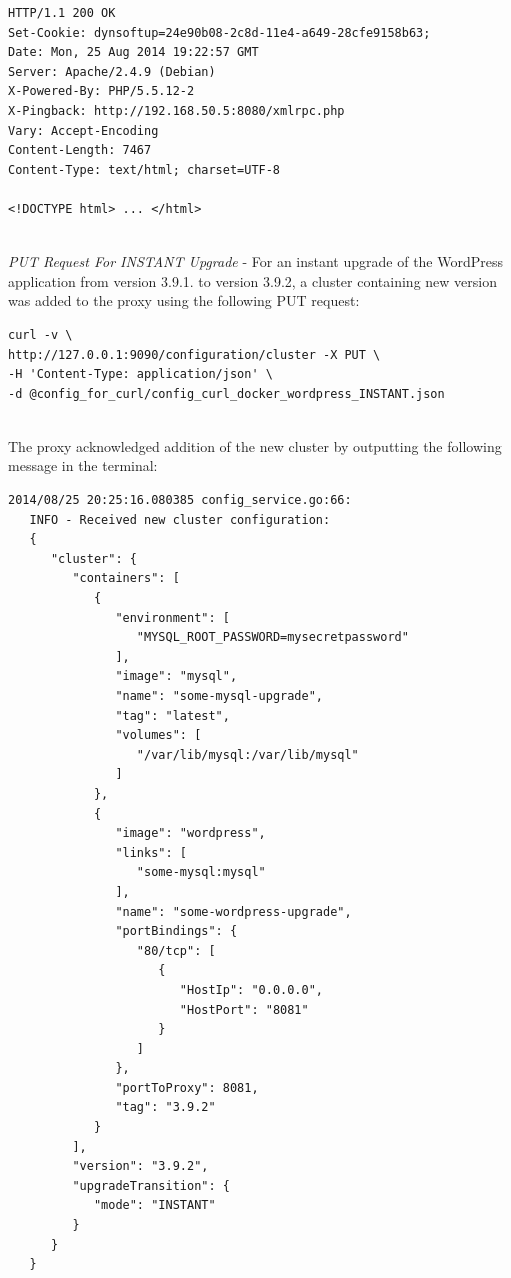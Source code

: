 \documentclass[a4paper,11pt,twoside]{report}
\begin{document}
\begin{lstlisting}[language=terminal] 
HTTP/1.1 200 OK
Set-Cookie: dynsoftup=24e90b08-2c8d-11e4-a649-28cfe9158b63;
Date: Mon, 25 Aug 2014 19:22:57 GMT
Server: Apache/2.4.9 (Debian)
X-Powered-By: PHP/5.5.12-2
X-Pingback: http://192.168.50.5:8080/xmlrpc.php
Vary: Accept-Encoding
Content-Length: 7467
Content-Type: text/html; charset=UTF-8

<!DOCTYPE html> ... </html>
\end{lstlisting} 

\noindent\\
\textit{PUT Request For INSTANT Upgrade} - For an instant upgrade of the WordPress application from version 3.9.1. to version 3.9.2, a cluster containing new version was added to the proxy using the following PUT request: \smallskip 

\begin{lstlisting}[language=terminal] 
curl -v \
http://127.0.0.1:9090/configuration/cluster -X PUT \
-H 'Content-Type: application/json' \ 
-d @config_for_curl/config_curl_docker_wordpress_INSTANT.json
\end{lstlisting}

\noindent\\
The proxy acknowledged addition of the new cluster by outputting the following message in the terminal: \smallskip 

\begin{lstlisting}[language=terminal] 
2014/08/25 20:25:16.080385 config_service.go:66:     
   INFO - Received new cluster configuration:
   {
      "cluster": {
         "containers": [
            {
               "environment": [
                  "MYSQL_ROOT_PASSWORD=mysecretpassword"
               ],
               "image": "mysql",
               "name": "some-mysql-upgrade",
               "tag": "latest",
               "volumes": [
                  "/var/lib/mysql:/var/lib/mysql"
               ]
            },
            {
               "image": "wordpress",
               "links": [
                  "some-mysql:mysql"
               ],
               "name": "some-wordpress-upgrade",
               "portBindings": {
                  "80/tcp": [
                     {
                        "HostIp": "0.0.0.0",
                        "HostPort": "8081"
                     }
                  ]
               },
               "portToProxy": 8081,
               "tag": "3.9.2"
            }
         ],
         "version": "3.9.2",
         "upgradeTransition": {
            "mode": "INSTANT"
         }		         
      }
   }
\end{lstlisting}   
\end{document}
